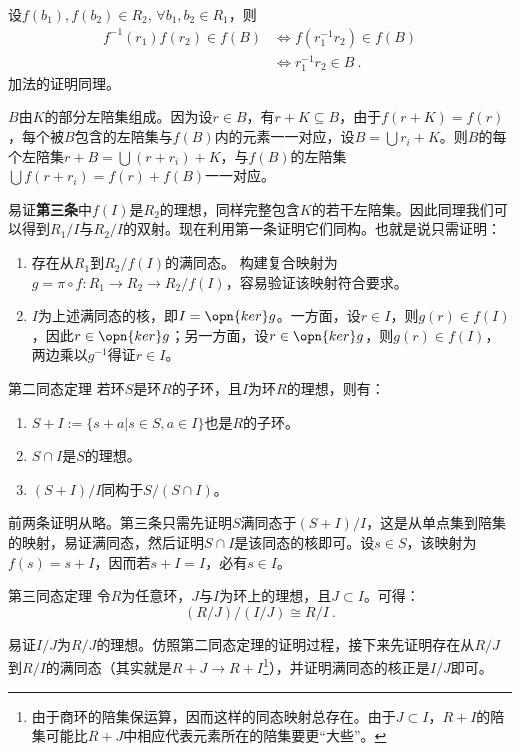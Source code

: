 设$f(b_1),f(b_2)\in R_2,\,\forall b_1,b_2\in R_1$，则
\begin{equation}
\begin{aligned}
f^{-1}(r_1)f(r_2)\in f(B)&\Leftrightarrow f(r_1^{-1}r_2)\in f(B)\\
&\Leftrightarrow r_1^{-1}r_2\in B~.
\end{aligned}
\end{equation}
加法的证明同理。

$B$由$K$的部分左陪集组成。因为设$r\in B$，有$r+K\subseteq B$，由于$f(r+K)=f(r)$，每个被$B$包含的左陪集与$f(B)$内的元素一一对应，设$B=\bigcup r_i+K$。则$B$的每个左陪集$r+B=\bigcup (r+r_i)+K$，与$f(B)$的左陪集$\bigcup f(r+r_i)=f(r)+f(B)$一一对应。

易证\textbf{第三条}中$f(I)$是$R_2$的理想，同样完整包含$K$的若干左陪集。因此同理我们可以得到$R_1/I$与$R_2/I$的双射。现在利用第一条证明它们同构。也就是说只需证明：
\begin{enumerate}
\item 存在从$R_1$到$R_2/f(I)$的满同态。
构建复合映射为$g=\pi\circ f:R_1\rightarrow R_2\rightarrow R_2/f(I)$，容易验证该映射符合要求。
\item $I$为上述满同态的核，即$I=\opn{ker}g$。一方面，设$r\in I$，则$g(r)\in f(I)$，因此$r\in \opn{ker}g$；另一方面，设$r\in \opn{ker}g$，则$g(r)\in f(I)$，两边乘以$g^{-1}$得证$r\in I$。
\end{enumerate}
\begin{theorem}{第二同态定理}
若环$S$是环$R$的子环，且$I$为环$R$的理想，则有：
\begin{enumerate}
\item $S+I:=\{s+a|s\in S,a\in I\}$也是$R$的子环。
\item $S\cap I$是$S$的理想。
\item $(S+I)/I$同构于$S/(S\cap I)$。
\end{enumerate}
\end{theorem}
前两条证明从略。第三条只需先证明$S$满同态于$(S+I)/I$，这是从单点集到陪集的映射，易证满同态，然后证明$S\cap I$是该同态的核即可。设$s\in S$，该映射为$f(s)=s+I$，因而若$s+I=I$，必有$s\in I$。
\begin{theorem}{第三同态定理}
令$R$为任意环，$J$与$I$为环上的理想，且$J\subset I$。可得：
\begin{equation}
(R/J)/(I/J)\cong R/I~.
\end{equation}
\end{theorem}
易证$I/J$为$R/J$的理想。仿照第二同态定理的证明过程，接下来先证明存在从$R/J$到$R/I$的满同态（其实就是$R+J\rightarrow R+I$\footnote{由于商环的陪集保运算，因而这样的同态映射总存在。由于$J\subset I$，$R+I$的陪集可能比$R+J$中相应代表元素所在的陪集要更“大些”。}），并证明满同态的核正是$I/J$即可。



